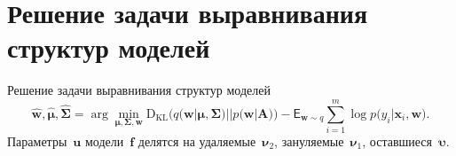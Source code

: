 \documentclass[10pt,pdf,hyperref={unicode}]{beamer}
\begin{document}
\section{Решение задачи выравнивания структур моделей}
\justifying
\begin{frame}{Решение задачи выравнивания структур моделей}\vspace{-.4cm}
\[
\hat{\mathbf{w}}, \hat{\bm{\mu}}, \hat{\bm{\Sigma}} = \arg \min_{\bm{\mu}, \bm{\Sigma}, \mathbf{w}} \text{D}_{\text{KL}}\bigr(q\bigr(\mathbf{w}|\bm{\mu}, \bm{\Sigma}\bigr)||p\bigr(\mathbf{w}|\mathbf{A}\bigr)\bigr) - \mathsf{E}_{\mathbf{w}\sim q}\sum_{i=1}^{m}\log p\bigr(y_i|\mathbf{x}_{i}, \mathbf{w}\bigr).
\]
Параметры~$\mathbf{u}$ модели~$\mathbf{f}$ делятся на {\color{red} удаляемые~$\bm{\nu}_2$}, {\color{blue} зануляемые~$\bm{\nu}_1$}, {оставшиеся~$\bm{\upsilon}$}.


\end{frame}
\end{document}
